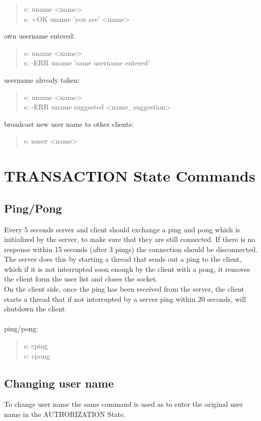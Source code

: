 \documentclass[a4paper,11pt]{article}
\begin{document}
\begin{quote}
  c: uname <name>\\
  s: +OK uname 'you are' <name>
\end{quote}
\noindent
own username entered:
\begin{quote}
  c: uname <name>\\
  s: -ERR uname 'same username entered'
\end{quote}
\noindent
username already taken:
\begin{quote}
  c: uname <name>\\
  s: -ERR uname suggested <name\_suggestion>
\end{quote}
\noindent
broadcast new user name to other clients:
\begin{quote}
  s: nuser <name>
\end{quote}


\clearpage
\section{TRANSACTION State Commands}
\subsection{Ping/Pong}
Every 5 seconds server and client should exchange a ping and pong which is initialized by the server, to make sure that they are still connected. If there is no response within 15 seconds (after 3 pings) the connection should be disconnected. The server does this by starting a thread that sends out a ping to the client, which if it is not interrupted soon enough by the client with a pong, it removes the client form the user list and closes the socket.\\
On the client side, once the ping has been received from the server, the client starts a thread that if not interrupted by a server ping within 20 seconds, will shutdown the client\\\\

\noindent
ping/pong:
\begin{quote}
  s: cping\\
  c: cpong
\end{quote}

\subsection{Changing user name}
To change user name the same command is used as to enter the original user name in the AUTHORIZATION State.\\\\
\end{document}
